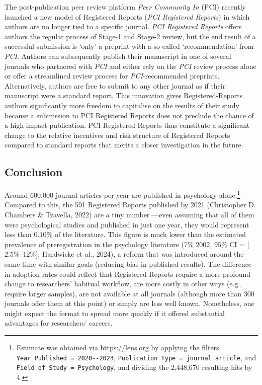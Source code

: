 \documentclass[
  ,man,mask,floatsintext]{apa6}
\begin{document}
The post-publication peer review platform \emph{Peer Community In} (PCI) recently launched a new model of Registered Reports (\emph{PCI Registered Reports}) in which authors are no longer tied to a specific journal.
\emph{PCI Registered Reports} offers authors the regular process of Stage-1 and Stage-2 review, but the end result of a successful submission is `only' a preprint with a so-called `recommendation' from \emph{PCI}.
Authors can subsequently publish their manuscript in one of several journals who partnered with \emph{PCI} and either rely on the \emph{PCI} review process alone or offer a streamlined review process for \emph{PCI}-recommended preprints.
Alternatively, authors are free to submit to any other journal as if their manuscript were a standard report.
This innovation gives Registered-Reports authors significantly more freedom to capitalise on the results of their study because a submission to PCI Registered Reports does not preclude the chance of a high-impact publication.
PCI Registered Reports thus constitute a significant change to the relative incentives and risk structure of Registered Reports compared to standard reports that merits a closer investigation in the future.

\hypertarget{conclusion}{%
\subsection{Conclusion}\label{conclusion}}

Around 600,000 journal articles per year are published in psychology alone.\footnote{Estimate was obtained via \url{https://lens.org} by applying the filters \texttt{Year\ Published\ =\ 2020-\/-2023}, \texttt{Publication\ Type\ =\ journal\ article}, and \texttt{Field\ of\ Study\ =\ Psychology}, and dividing the 2,448,670 resulting hits by 4.}
Compared to this, the 591 Registered Reports published by 2021 (Christopher D. Chambers \& Tzavella, 2022) are a tiny number\(\,\)---\(\,\)even assuming that all of them were psychological studies and published in just one year, they would represent less than \(0.10\%\) of the literature.
This figure is much lower than the estimated prevalence of preregistration in the psychology literature (\(7\%\) 2002, \(95\%\) CI = {[}\(2.5\%\)--\(12\%\){]}, Hardwicke et al., 2024), a reform that was introduced around the same time with similar goals (reducing bias in published results).
The difference in adoption rates could reflect that Registered Reports require a more profound change to researchers' habitual workflow, are more costly in other ways (e.g., require larger samples), are not available at all journals (although more than 300 journals offer them at this point) or simply are less well known.
Nonetheless, one might expect the format to spread more quickly if it offered substantial advantages for researchers' careers.
\end{document}
